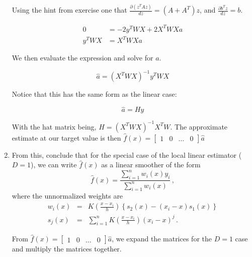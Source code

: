 \documentclass[10pt]{article}
\begin{document}
\begin{enumerate}[label=(\Alph*)]
        Using the hint from exercise one that $\frac{\partial (z^T A z)}{dz} = (A + A^T) z$, and $ \frac{\partial b^T z}{dz} = b$.

        \begin{align*}
            0 &= -2y^T W X + 2 X^T W X a \\
            y^T W X&= X^T W X a
        \end{align*}

        We then evaluate the expression and solve for $a$.

        $$\hat{a} = (X^T W X)^{-1} y^T W X$$

        Notice that this has the same form as the linear case:

        $$\hat{a} = H y$$

        With the hat matrix being, $H = (X^T W X)^{-1} X^T W$. The approximate estimate at our target value is then $\hat{f}(x) = \begin{bmatrix}1 & 0 & \dots & 0\end{bmatrix} \hat{a}$


        \item From this, conclude that for the special case of the local linear estimator ($D=1$), we can write $\hat{f}(x)$ as a linear smoother of the form
        $$
        \hat{f}(x) = \frac{\sum_{i=1}^n w_i(x) y_i }{\sum_{i=1}^n w_i(x)} \, ,
        $$
        where the unnormalized weights are
        \begin{eqnarray*}
        w_i(x) &=& K \left( \frac{x-x_i}{h} \right) \left\{  s_2(x) - (x_i-x) s_1(x) \right\}\\
        s_j(x) &=& \sum_{i=1}^n K \left( \frac{x-x_i}{h} \right) (x_i-x)^j \, .
        \end{eqnarray*}

        From $\hat{f}(x) = \begin{bmatrix}1 & 0 & \dots & 0\end{bmatrix} \hat{a}$, we expand the matrices for the $D=1$ case and multiply the matrices together.


\end{enumerate}
\end{document}
